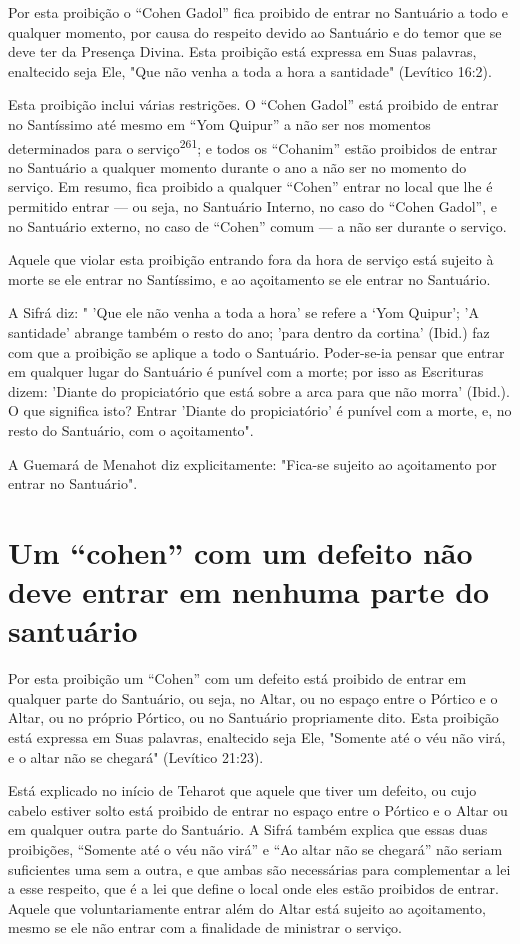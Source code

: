 Por esta proibição o ``Cohen Gadol'' fica proibido de entrar no San­tuário
a todo e qualquer momento, por causa do respeito devido ao Santuário e
do temor que se deve ter da Presença Divina. Esta proibição está
expressa em Suas palavras, enaltecido seja Ele, "Que não venha a toda a
hora a santida­de" (Levítico 16:2).

Esta proibição inclui várias restrições. O ``Cohen Gadol'' está proi­bido
de entrar no Santíssimo até mesmo em ``Yom Quipur'' a não ser nos
mo­mentos determinados para o serviço\textsuperscript{261}; e todos os
``Cohanim'' estão proibi­dos de entrar no Santuário a qualquer momento
durante o ano a não ser no momento do serviço. Em resumo, fica proibido
a qualquer ``Cohen'' entrar no local que lhe é permitido entrar --- ou
seja, no Santuário Interno, no caso do ``Cohen Gadol'', e no Santuário
externo, no caso de ``Cohen'' comum --- a não ser durante o serviço.

Aquele que violar esta proibição entrando fora da hora de serviço está
sujeito à morte se ele entrar no Santíssimo, e ao açoitamento se ele
entrar no Santuário.

A Sifrá diz: " 'Que ele não venha a toda a hora' se refere a `Yom
Qui­pur'; 'A santidade' abrange também o resto do ano; 'para dentro da
cortina'
(Ibid.) faz com que a proibição se aplique a todo o Santuário.
Poder-se-ia pen­sar que entrar em qualquer lugar do Santuário é punível
com a morte; por isso as Escrituras dizem: 'Diante do propiciatório que
está sobre a arca para que não morra' (Ibid.). O que significa isto?
Entrar 'Diante do propiciatório' é punível com a morte, e, no resto do
Santuário, com o açoitamento".

A Guemará de Menahot diz explicitamente: "Fica-se sujeito ao
açoi­tamento por entrar no Santuário".

\section{Um ``cohen'' com um defeito não deve entrar em nenhuma parte do santuário}

Por esta proibição um ``Cohen'' com um defeito está proibido de entrar em
qualquer parte do Santuário, ou seja, no Altar, ou no espaço entre o
Pórtico e o Altar, ou no próprio Pórtico, ou no Santuário propriamente
dito. Esta proibição está expressa em Suas palavras, enaltecido seja
Ele, "Somente até o véu não virá, e o altar não se chegará" (Levítico
21:23).

Está explicado no início de Teharot que aquele que tiver um defei­to, ou
cujo cabelo estiver solto está proibido de entrar no espaço entre o
Pórti­co e o Altar ou em qualquer outra parte do Santuário. A Sifrá
também explica que essas duas proibições, ``Somente até o véu não virá'' e
``Ao altar não se chegará'' não seriam suficientes uma sem a outra, e que
ambas são necessárias para complementar a lei a esse respeito, que é a
lei que define o local onde eles estão proibidos de entrar. Aquele que
voluntariamente entrar além do Altar es­tá sujeito ao açoitamento, mesmo
se ele não entrar com a finalidade de minis­trar o serviço.

